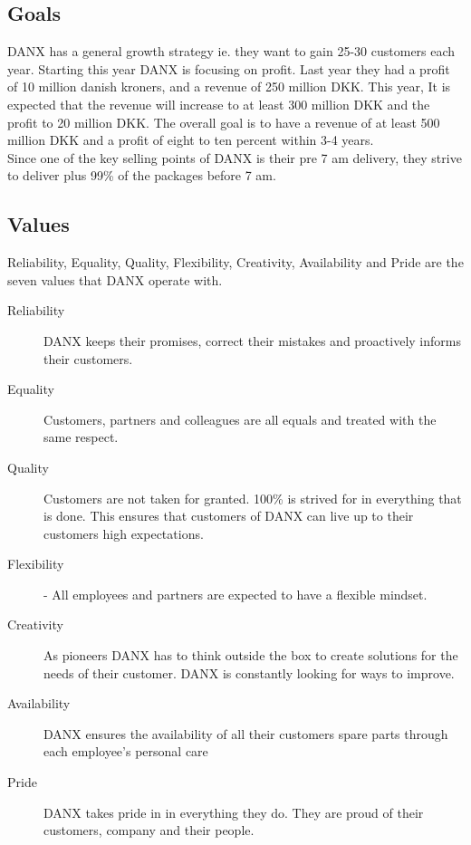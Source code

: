 \subsection{Goals}
DANX has a general growth strategy ie. they want to gain 25-30 customers each year. Starting this year DANX is focusing on profit. Last year they had a profit of 10 million danish kroners, and a revenue of 250 million DKK. This year, It is expected that the revenue will increase to at least 300 million DKK and the profit to 20 million DKK. The overall goal is to have a revenue of at least 500 million DKK and a profit of eight to ten percent within 3-4 years.\cite{mail}\\
Since one of the key selling points of DANX is their pre 7 am delivery, they strive to deliver plus 99\% of the packages before 7 am.

\subsection{Values}
Reliability, Equality, Quality, Flexibility, Creativity, Availability and Pride are the seven values that DANX operate with.\cite{mail}

\begin{description}
\item[Reliability] DANX keeps their promises, correct their mistakes and proactively informs their customers.
\item[Equality] Customers, partners and colleagues are all equals and treated with the same respect.
\item[Quality] Customers are not taken for granted. 100\% is strived for in everything that is done. This ensures that customers of DANX can live up to their customers high expectations.
\item[Flexibility] - All employees and partners are expected to have a flexible mindset.
\item[Creativity] As pioneers DANX has to think outside the box to create solutions for the needs of their customer. DANX is constantly looking for ways to improve.
\item[Availability] DANX ensures the availability of all their customers spare parts through each employee’s personal care
\item[Pride] DANX takes pride in in everything they do. They are proud of their customers, company and their people.
\end{description}

